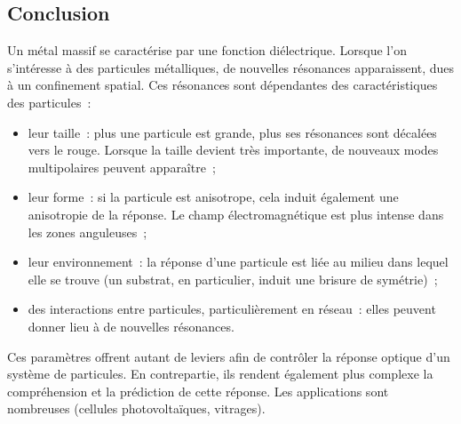 	\subsection{Conclusion}
Un métal massif se caractérise par une fonction diélectrique. Lorsque l'on s'intéresse à des particules métalliques, de nouvelles résonances apparaissent, dues à un confinement spatial. Ces résonances sont dépendantes des caractéristiques des particules~:
\begin{itemize}
\item leur taille~: plus une particule est grande, plus ses résonances sont décalées vers le rouge. Lorsque la taille devient très importante, de nouveaux modes multipolaires peuvent apparaître~;
\item leur forme~: si la particule est anisotrope, cela induit également une anisotropie de la
réponse. Le champ électromagnétique est plus intense dans les zones anguleuses~;
\item leur environnement~: la réponse d'une particule est liée au milieu dans
lequel elle se trouve (un substrat, en particulier, induit une brisure de symétrie)~;
\item des interactions entre particules, particulièrement en réseau~: elles peuvent donner lieu à de nouvelles résonances.
\end{itemize}
Ces paramètres offrent autant de leviers afin de contrôler la réponse optique d'un système de particules. En contrepartie, ils rendent également plus complexe la compréhension et la prédiction de cette réponse. Les applications sont nombreuses (cellules photovoltaïques, vitrages).

\newpage


